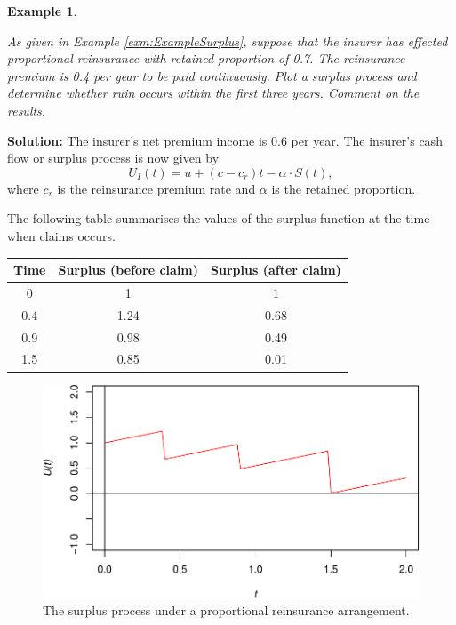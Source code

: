 \documentclass[landscape, 20pt]{extreport}
\theoremstyle{definition}
\theoremstyle{definition}
\newtheorem{example}{Example}[chapter]
\theoremstyle{definition}
\theoremstyle{definition}
\theoremstyle{remark}
\begin{document}
\newpage \begin{example}
\protect\hypertarget{exm:unlabeled-div-56}{}\label{exm:unlabeled-div-56}

\emph{As given in Example
\ref{exm:ExampleSurplus}, suppose that the insurer has effected
proportional reinsurance with retained proportion of 0.7. The
reinsurance premium is 0.4 per year to be paid continuously. Plot a
surplus process and determine whether ruin occurs within the first three
years. Comment on the results.}

\end{example}

\textbf{Solution:}
The insurer's net premium income is 0.6 per year. The insurer's cash flow or surplus process is now given by
\begin{equation}
U_I(t) = u + (c - c_r)t - \alpha \cdot S(t),
\end{equation}
where \(c_r\) is the reinsurance premium rate and \(\alpha\) is the retained proportion.

The following table summarises the values of the surplus function at the time when claims occurs.

\begin{longtable}[]{@{}ccc@{}}
\toprule
Time & Surplus (before claim) & Surplus (after claim) \\
\midrule
\endhead
0 & 1 & 1 \\
0.4 & 1.24 & 0.68 \\
0.9 & 0.98 & 0.49 \\
1.5 & 0.85 & 0.01 \\
\bottomrule
\end{longtable}

\begin{figure}
\centering
\includegraphics{unnamed-chunk-21-1.pdf}
\caption{\label{fig:unnamed-chunk-21}The surplus process under a proportional reinsurance arrangement.}
\end{figure}
\end{document}
